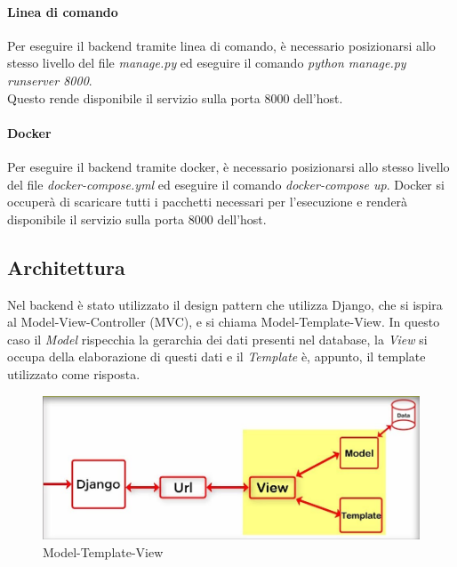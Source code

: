 \paragraph{Linea di comando}
Per eseguire il backend tramite linea di comando, è necessario posizionarsi allo stesso livello del file \textit{manage.py} ed eseguire il comando \textit{python manage.py runserver 8000}.\\Questo rende disponibile il servizio sulla porta 8000 dell'host.
\paragraph{Docker}
Per eseguire il backend tramite docker, è necessario posizionarsi allo stesso livello del file \textit{docker-compose.yml} ed eseguire il comando \textit{docker-compose up}. Docker si occuperà di scaricare tutti i pacchetti necessari per l'esecuzione e renderà disponibile il servizio sulla porta 8000 dell'host.
\subsection{Architettura}
Nel backend è stato utilizzato il design pattern che utilizza Django, che si ispira al Model-View-Controller (MVC), e si chiama Model-Template-View.
In questo caso il \textit{Model} rispecchia la gerarchia dei dati presenti nel database, la \textit{View} si occupa della elaborazione di questi dati e il \textit{Template} è, appunto, il template utilizzato come risposta.
\begin{figure}[H]
	\centering
	\includegraphics[width=16cm]{res/images/mvt.png}
	\caption{Model-Template-View}
	\label{fig:Model-Template-View}
\end{figure}